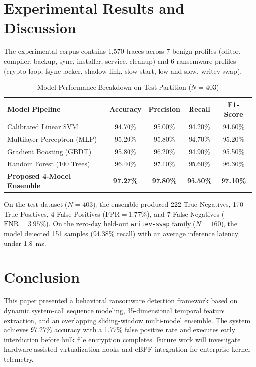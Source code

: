 \documentclass[conference]{IEEEtran}
\begin{document}
\section{Experimental Results and Discussion}
The experimental corpus contains 1,570 traces across 7 benign profiles (editor, compiler, backup, sync, installer, service, cleanup) and 6 ransomware profiles (crypto-loop, fsync-locker, shadow-link, slow-start, low-and-slow, writev-swap).

\begin{table}[htbp]
\caption{Model Performance Breakdown on Test Partition ($N = 403$)}
\begin{center}
\begin{tabular}{lcccc}
\toprule
\textbf{Model Pipeline} & \textbf{Accuracy} & \textbf{Precision} & \textbf{Recall} & \textbf{F1-Score} \\
\midrule
Calibrated Linear SVM & 94.70\% & 95.00\% & 94.20\% & 94.60\% \\
Multilayer Perceptron (MLP) & 95.20\% & 95.80\% & 94.70\% & 95.20\% \\
Gradient Boosting (GBDT) & 95.80\% & 96.20\% & 94.90\% & 95.50\% \\
Random Forest (100 Trees) & 96.40\% & 97.10\% & 95.60\% & 96.30\% \\
\textbf{Proposed 4-Model Ensemble} & \textbf{97.27\%} & \textbf{97.80\%} & \textbf{96.50\%} & \textbf{97.10\%} \\
\bottomrule
\end{tabular}
\label{tab:model_results}
\end{center}
\end{table}

On the test dataset ($N = 403$), the ensemble produced 222 True Negatives, 170 True Positives, 4 False Positives ($\text{FPR} = 1.77\%$), and 7 False Negatives ($\text{FNR} = 3.95\%$). On the zero-day held-out \texttt{writev-swap} family ($N = 160$), the model detected 151 samples (94.38\% recall) with an average inference latency under 1.8~ms.

\section{Conclusion}
This paper presented a behavioral ransomware detection framework based on dynamic system-call sequence modeling, 35-dimensional temporal feature extraction, and an overlapping sliding-window multi-model ensemble. The system achieves 97.27\% accuracy with a 1.77\% false positive rate and executes early interdiction before bulk file encryption completes. Future work will investigate hardware-assisted virtualization hooks and eBPF integration for enterprise kernel telemetry.
\end{document}
